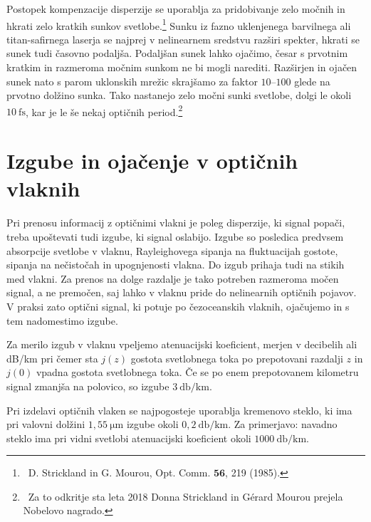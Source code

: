 \begin{remark}
Postopek kompenzacije disperzije se uporablja za pridobivanje zelo močnih in hkrati zelo
kratkih sunkov svetlobe.\footnote{~D. Strickland in G. Mourou, Opt. Comm. $\mathbf{56}$, 219 (1985).} 
Sunku iz fazno uklenjenega barvilnega 
ali titan-safirnega
laserja se najprej v nelinearnem sredstvu razširi spekter, hkrati
se sunek tudi časovno podaljša. Podaljšan sunek lahko ojačimo, česar 
s prvotnim kratkim in razmeroma močnim sunkom ne bi mogli narediti. Razširjen
in ojačen sunek nato s parom uklonskih mrežic skrajšamo za 
faktor $10$--$100$ glede na prvotno dolžino sunka. Tako nastanejo zelo močni sunki
svetlobe, dolgi le okoli $10~\si{\femto\second}$, kar je le še nekaj optičnih 
period.\footnote{~Za to odkritje sta leta 2018 Donna Strickland in
G\'erard Mourou prejela Nobelovo nagrado.}
\end{remark}

\section{Izgube in ojačenje v optičnih vlaknih}
Pri prenosu informacij z optičnimi vlakni je poleg disperzije, ki signal popači,
treba upoštevati tudi izgube, ki signal oslabijo. 
Izgube so posledica predvsem absorpcije svetlobe v vlaknu,
Rayleighovega sipanja na fluktuacijah gostote, 
sipanja na nečistočah in upognjenosti vlakna. Do izgub prihaja tudi na stikih 
med vlakni. Za prenos na dolge
razdalje je tako potreben razmeroma močen signal, a ne premočen,
saj lahko v vlaknu pride do nelinearnih optičnih pojavov. V praksi zato 
optični signal, ki potuje po čezoceanskih vlaknih, ojačujemo in s tem nadomestimo
izgube.

Za merilo izgub v vlaknu vpeljemo atenuacijski 
koeficient, merjen v decibelih ali dB/km
pri čemer sta $j(z)$ gostota svetlobnega toka po prepotovani razdalji $z$ in $j(0)$
vpadna gostota svetlobnega toka. Če se po enem prepotovanem
kilometru signal zmanjša na polovico, so izgube $3~\si{\decibel/\kilo\meter}$.

Pri izdelavi optičnih vlaken se najpogosteje uporablja kremenovo steklo, ki 
ima pri valovni dolžini $1,55~\si{\micro\meter}$ izgube okoli 
$0,2~\si{\decibel/\kilo\meter}$.  
Za primerjavo: navadno steklo ima pri vidni svetlobi atenuacijski koeficient okoli 
$1000~\si{\decibel/\kilo\meter}$.

